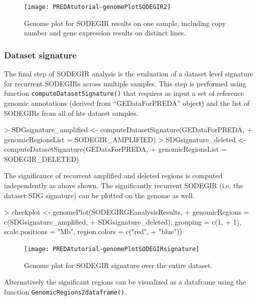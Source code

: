 \documentclass[a4paper,10pt]{article}
\begin{document}
\begin{figure}[htbp]
 \centering
\texttt{[image: PREDAtutorial-genomePlotSODEGIR2]}
 \caption{Genome plot for SODEGIR results on one sample, including copy number and gene expression results on distinct lines.}
 \label{fig:genomePlotSODEGIROnesamplefull}
\end{figure}


\subsubsection{Dataset signature}
The final step of SODEGIR analysis is the evaluation of a dataset level signature for recurrent SODEGIRs across multiple samples.
This step is performed using function \texttt{computeDatasetSignature()} that requires as input a set of reference genomic annotations (derived from ``GEDataForPREDA'' object) and the list of SODEGIRs from all of hte dataset samples.

\begin{Schunk}
\begin{Sinput}
> SDGsignature_amplified <- computeDatasetSignature(GEDataForPREDA, 
+     genomicRegionsList = SODEGIR_AMPLIFIED)
> SDGsignature_deleted <- computeDatasetSignature(GEDataForPREDA, 
+     genomicRegionsList = SODEGIR_DELETED)
\end{Sinput}
\end{Schunk}

The significance of recurrent amplified and deleted regions is computed independently as above shown.
The significantly recurrent SODEGIR (i.e. the dataset SDG signature) can be plotted on the genome as well.

\begin{Schunk}
\begin{Sinput}
> checkplot <- genomePlot(SODEGIRGEanalysisResults, 
+     genomicRegions = c(SDGsignature_amplified, 
+         SDGsignature_deleted), grouping = c(1, 
+         1), scale.positions = "Mb", region.colors = c("red", 
+         "blue"))
\end{Sinput}
\end{Schunk}


\begin{figure}[htbp]
 \centering
\texttt{[image: PREDAtutorial-genomePlotSODEGIRsignature]}
 \caption{Genome plot for SODEGIR signature over the entire dataset.}
 \label{fig:genomePlotSODEGIRsignature}
\end{figure}


Alternatively the significant regions can be visualized as a dataframe using the function \texttt{GenomicRegions2dataframe()}.
\end{document}
